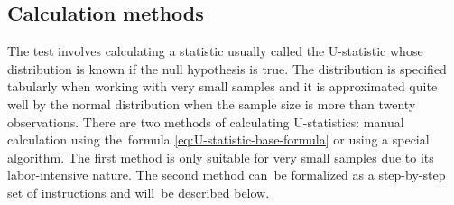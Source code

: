 \documentclass[]{scrreprt}
\begin{document}
\subsection{Calculation methods}
The test involves calculating a statistic usually called the U-statistic whose distribution is known if the null hypothesis is true. The distribution is specified tabularly when working with very small samples and it is approximated quite well by the normal distribution when the sample size is more than twenty observations. There are two methods of calculating U-statistics: manual calculation using the~formula \ref{eq:U-statistic-base-formula} or using a special algorithm. The first method is only suitable for very small samples due to its labor-intensive nature. The second method can~be formalized as a step-by-step set of instructions and will~be described below.
\end{document}
